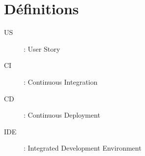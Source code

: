 \section{Définitions}

\begin{description}
  \item[US]: User Story 
  \item[CI]: Continuous Integration 
  \item[CD]: Continuous Deployment 
  \item[IDE]: Integrated Development Environment 
\end{description}